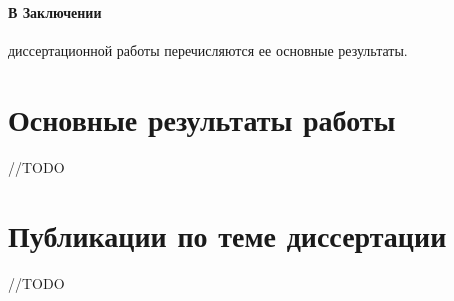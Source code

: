 \documentclass[14pt,autoref,href
,facsimile
]{disser}
\begin{document}
\paragraph{В Заключении} диссертационной работы перечисляются ее основные результаты.


\section*{Основные результаты работы}
//TODO


\section*{Публикации по теме диссертации}
//TODO



%
%
\end{document}
